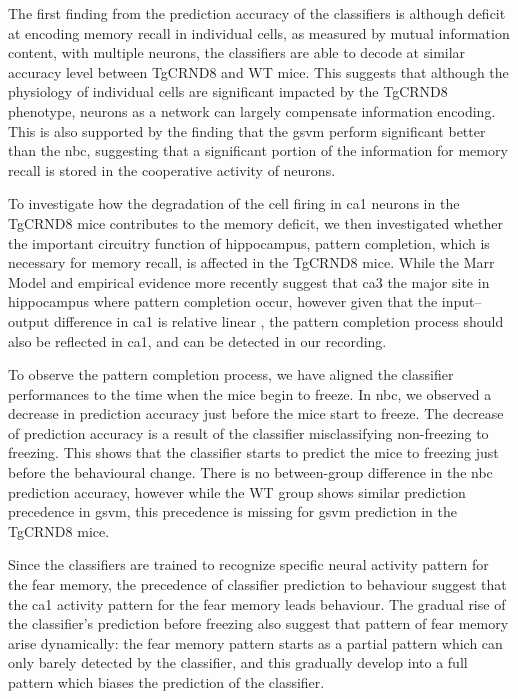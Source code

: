 The first finding from the prediction accuracy of the classifiers is although deficit at encoding memory recall in individual cells, as measured by mutual information content, with multiple neurons, the classifiers are able to decode at similar accuracy level between TgCRND8 and WT mice. This suggests that although the physiology of individual cells are significant impacted by the TgCRND8 phenotype, neurons as a network can largely compensate information encoding. This is also supported by the finding that the \gls{gsvm} perform significant better than the \gls{nbc}, suggesting that a significant portion of the information for memory recall is stored in the cooperative activity of neurons. 

To investigate how the degradation of the cell firing in \gls{ca1} neurons in the TgCRND8 mice contributes to the memory deficit, we then investigated whether the important circuitry function of hippocampus, pattern completion, which is necessary for memory recall, is affected in the TgCRND8 mice. While the Marr Model and empirical evidence more recently \citep{rolls13, neunuebel14} suggest that \gls{ca3} the major site in hippocampus where pattern completion occur, however given that the input--output difference in \gls{ca1} is relative linear \citep{neunuebel14, knierim16}, the pattern completion process should also be reflected in \gls{ca1}, and can be detected in our recording. 

To observe the pattern completion process, we have aligned the classifier performances to the time when the mice begin to freeze. In \gls{nbc}, we observed a decrease in prediction accuracy just before the mice start to freeze. The decrease of prediction accuracy is a result of the classifier misclassifying non-freezing to freezing. This shows that the classifier starts to predict the mice to freezing just before the behavioural change. There is no between-group difference in the \gls{nbc} prediction accuracy, however while the WT group shows similar prediction precedence in \gls{gsvm}, this precedence is missing for \gls{gsvm} prediction in the TgCRND8 mice. 

Since the classifiers are trained to recognize specific neural activity pattern for the fear memory, the precedence of classifier prediction to behaviour suggest that the \gls{ca1} activity pattern for the fear memory leads behaviour. The gradual rise of the classifier's prediction before freezing also suggest that pattern of fear memory arise dynamically: the fear memory pattern starts as a partial pattern which can only barely detected by the classifier, and this gradually develop into a full pattern which biases the prediction of the classifier. 

